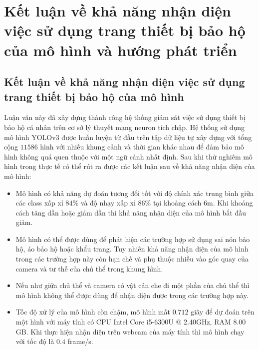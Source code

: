 \chapter{Kết luận về khả năng nhận diện việc sử dụng trang thiết bị bảo hộ của mô hình và hướng phát triển}
\section{Kết luận về khả năng nhận diện việc sử dụng trang thiết bị bảo hộ của mô hình}
Luận văn này đã xây dựng thành công hệ thống giám sát việc sử dụng thiết bị bảo hộ cá nhân trên cơ sở lý thuyết mạng neuron tích chập. Hệ thống sử dụng mô hình YOLOv3 được huấn luyện từ đầu trên tập dữ liệu tự xây dựng với tổng cộng $11586$ hình với nhiều khung cảnh và thời gian khác nhau để đảm bảo mô hình không quá quen thuộc với một ngữ cảnh nhất định. Sau khi thử nghiêm mô hình trong thực tế có thể rút ra được các kết luận sau về khả năng nhận diện của mô hình:
\begin{itemize}
	\item Mô hình có khả năng dự đoán tương đối tốt với độ chính xác trung bình giữa các class xấp xỉ $84\%$ và độ nhạy xấp xỉ $86\%$ tại khoảng cách $6$m. Khi khoảng cách tăng dần hoặc giảm dần thì khả năng nhận diện của mô hình bắt đầu giảm.
	\item Mô hình có thể được dùng để phát hiện các trường hợp sử dụng sai nón bảo hộ, áo bảo hộ hoặc khẩu trang. Tuy nhiên khả năng nhận diện của mô hình trong các trường hợp này còn hạn chế và phụ thuộc nhiều vào góc quay của camera và tư thế của chủ thể trong khung hình.
	\item Nếu như giữa chủ thể và camera có vật cản che đi một phần của chủ thể thì mô hình không thể được dùng để nhận diện được trong các trường hợp này.
	\item Tốc độ xử lý của mô hình còn chậm, mô hình mất $0.712$ giây để dự đoán trên một hình với máy tính có CPU Intel Core i5-6300U @ 2.40GHz, RAM 8.00 GB. Khi thực hiện nhận diện trên webcam của máy tính thì mô hình chạy với tốc độ là $0.4$ frame/s.
\end{itemize}

